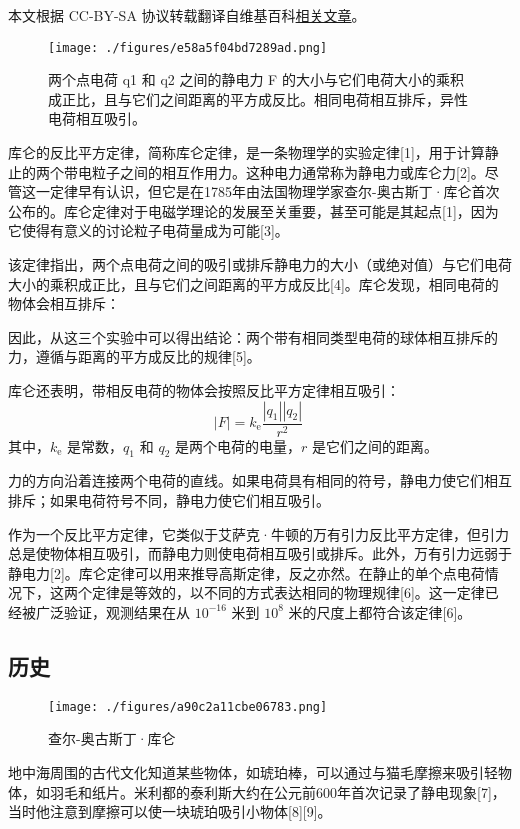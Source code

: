 
本文根据 CC-BY-SA 协议转载翻译自维基百科\href{https://en.wikipedia.org/wiki/Coulomb\%27s_law}{相关文章}。

\begin{figure}[ht]
\centering
\texttt{[image: ./figures/e58a5f04bd7289ad.png]}
\caption{两个点电荷 q1 和 q2 之间的静电力 F 的大小与它们电荷大小的乘积成正比，且与它们之间距离的平方成反比。相同电荷相互排斥，异性电荷相互吸引。} \label{fig_KL_1}
\end{figure}
库仑的反比平方定律，简称库仑定律，是一条物理学的实验定律[1]，用于计算静止的两个带电粒子之间的相互作用力。这种电力通常称为静电力或库仑力[2]。尽管这一定律早有认识，但它是在1785年由法国物理学家查尔-奥古斯丁·库仑首次公布的。库仑定律对于电磁学理论的发展至关重要，甚至可能是其起点[1]，因为它使得有意义的讨论粒子电荷量成为可能[3]。

该定律指出，两个点电荷之间的吸引或排斥静电力的大小（或绝对值）与它们电荷大小的乘积成正比，且与它们之间距离的平方成反比[4]。库仑发现，相同电荷的物体会相互排斥：

因此，从这三个实验中可以得出结论：两个带有相同类型电荷的球体相互排斥的力，遵循与距离的平方成反比的规律[5]。

库仑还表明，带相反电荷的物体会按照反比平方定律相互吸引：
\[
|F| = k_{\text{e}} \frac{|q_1| |q_2|}{r^2}~
\]
其中，\( k_{\text{e}} \) 是常数，\( q_1 \) 和 \( q_2 \) 是两个电荷的电量，\( r \) 是它们之间的距离。

力的方向沿着连接两个电荷的直线。如果电荷具有相同的符号，静电力使它们相互排斥；如果电荷符号不同，静电力使它们相互吸引。

作为一个反比平方定律，它类似于艾萨克·牛顿的万有引力反比平方定律，但引力总是使物体相互吸引，而静电力则使电荷相互吸引或排斥。此外，万有引力远弱于静电力[2]。库仑定律可以用来推导高斯定律，反之亦然。在静止的单个点电荷情况下，这两个定律是等效的，以不同的方式表达相同的物理规律[6]。这一定律已经被广泛验证，观测结果在从 \( 10^{-16} \) 米到 \( 10^8 \) 米的尺度上都符合该定律[6]。
\subsection{历史}
\begin{figure}[ht]
\centering
\texttt{[image: ./figures/a90c2a11cbe06783.png]}
\caption{查尔-奥古斯丁·库仑} \label{fig_KL_2}
\end{figure}
地中海周围的古代文化知道某些物体，如琥珀棒，可以通过与猫毛摩擦来吸引轻物体，如羽毛和纸片。米利都的泰利斯大约在公元前600年首次记录了静电现象[7]，当时他注意到摩擦可以使一块琥珀吸引小物体[8][9]。

